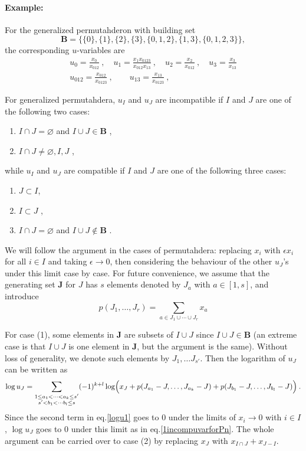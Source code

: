 \documentclass[hidelinks,12pt]{article}
\begin{document}
\paragraph{Example:} For the generalized permutahderon with building set 
\[
\mathbf{B}=\{\{0\},\{1\},\{2\},\{3\},\{0,1,2\},\{1,3\},\{0,1,2,3\}\},
\]
the corresponding $u$-variables are
\begin{gather*}
   u_{0}=\frac{x_{0}}{x_{012}} \:,\quad  u_{1}=\frac{x_{1}x_{0123}}{x_{012}x_{13}} \:,\quad 
   u_{2}=\frac{x_{2}}{x_{012}} \:, \quad u_{3}=\frac{x_{3}}{x_{13}} \\
   u_{012}=\frac{x_{012}}{x_{0123}}\:,\qquad u_{13}=\frac{x_{13}}{x_{0123}} \:, \quad 
\end{gather*}

For generalized permutahdera, $u_{I}$ and $u_{J}$ are incompatible if $I$ and $J$ are one of the following two cases:
\begin{enumerate}
   \item $I\cap J=\varnothing$ and $I\cup J \in \mathbf{B}$ \:, 
   \item $I\cap J \neq \varnothing,I, J $ \:,
\end{enumerate}
while $u_{I}$ and $u_{J}$ are compatible if $I$ and $J$ are one of the following three cases:
\begin{enumerate}[resume]
   \item $J\subset I$\:,
   \item $I\subset J$ \:,
   \item $I\cap J=\varnothing$ and $I\cup J \notin \mathbf{B}$ \:.
\end{enumerate}
We will follow the argument in the cases of permutahdera: replacing $x_{i}$ with $ \epsilon x_{i}$ for all $i\in I$ and taking $\epsilon \to 0$, then considering the behaviour of the other $u_{J}$'s under this limit case by case. For future convenience, we assume that the generating set $\mathbf{J}$ for $J$ has $s$ elements denoted by $J_{a}$ with $a\in[1,s]$, and introduce 
\begin{equation}
   p(J_{1},\ldots,J_{r}) = \sum_{a\in J_{1}\cup\cdots\cup J_{r}}x_{a}
\end{equation}

For case (1), some elements in $\mathbf{J}$ are subsets of $I\cup J$ since $I\cup J \in \mathbf{B}$ (an extreme case is that  $I\cup J$ is one element in $\mathbf{J}$, but the argument is the same). Without loss of generality, we denote such elements by $J_{1},\ldots J_{s'}$. Then the logarithm of $u_{J}$ can be written as 
\begin{equation}
   \log u_{J}= \sum_{\substack {1 \leq a_{1}<\cdots<a_{k}\leq s'\\ s'<b_{1}<\cdots b_{l}\leq s}}(-1)^{k+l}\log\Bigl( x_{J}+ p(J_{a_{1}}-J,\ldots,J_{a_{k}}-J) + p(J_{b_{1}}-J,\ldots, J_{b_{l}}-J)\Bigr) \:. \label{logu1}
\end{equation}
Since the second term in eq.\eqref{logu1} goes to 0 under the limits of $x_{i}\to 0$ with $i\in I$, $\log u_{J}$ goes to 0 under this limit as in eq.\eqref{1incompuvarforPn}. The whole argument can be carried over to case (2) by replacing $x_{J}$ with $x_{I\cap J}+ x_{J-I}$.
\end{document}
